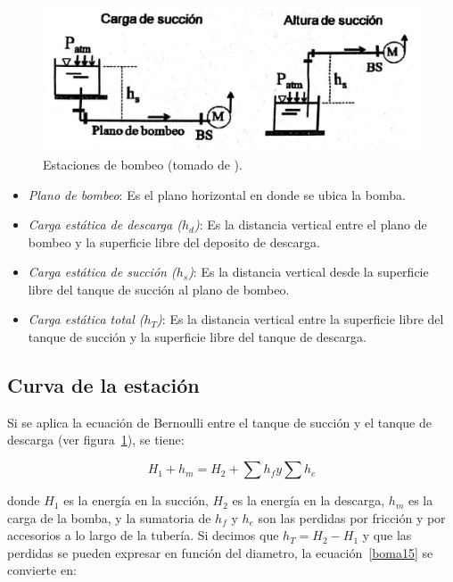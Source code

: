 \documentclass[11pt, oneside]{article}
\begin{document}
\begin{figure}[h]
\centering
\includegraphics[width=12cm]{./figs/bom12.jpeg}
\caption{Estaciones de bombeo (tomado de \cite{agudelo2011mecanica}).} 
\label{bom12}
\end{figure}

\begin{itemize}
\item \emph{Plano de bombeo}: Es el plano horizontal en donde se ubica la bomba.  
\item \emph{Carga est\'atica de descarga ($h_d$)}: Es la distancia vertical entre el plano de bombeo y la superficie libre del deposito de descarga. 
\item \emph{Carga est\'atica de succi\'on ($h_s$)}: Es la distancia vertical desde la superficie libre del tanque de succi\'on al plano de bombeo.
\item \emph{Carga est\'atica total ($h_T$)}: Es la distancia vertical entre la superficie libre del tanque de succi\'on y la superficie libre del tanque de descarga. 
\end{itemize}

\subsection{Curva de la estaci\'on}
Si se aplica la ecuaci\'on de Bernoulli entre el tanque de succi\'on y el tanque de descarga (ver figura~\ref{bom12}), se tiene:

\begin{equation}
H_1 + h_m = H_2 + \sum h_f y \sum h_e 
\label{boma15}
\end{equation}

donde $H_1$ es la energ\'ia en la succi\'on, $H_2$ es la energ\'ia en la descarga, $h_m$ es la carga de la bomba, y la sumatoria de $h_f$ y $h_e$ son las perdidas por fricci\'on y por accesorios a lo largo de la tuber\'ia. Si decimos que $h_T = H_2-H_1$ y que las perdidas se pueden expresar en funci\'on del diametro, la ecuaci\'on~\ref{boma15} se convierte en:
\end{document}
